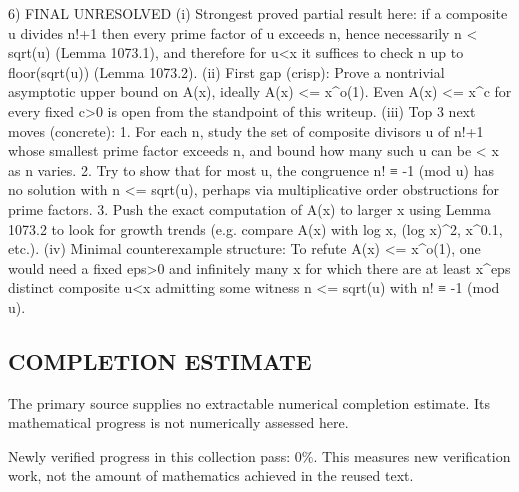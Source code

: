 6) FINAL
UNRESOLVED
(i) Strongest proved partial result here: if a composite u divides n!+1 then every prime factor of u exceeds n, hence necessarily n < sqrt(u) (Lemma 1073.1), and therefore for u<x it suffices to check n up to floor(sqrt(u)) (Lemma 1073.2).
(ii) First gap (crisp): Prove a nontrivial asymptotic upper bound on A(x), ideally A(x) <= x^{o(1)}. Even A(x) <= x^c for every fixed c>0 is open from the standpoint of this writeup.
(iii) Top 3 next moves (concrete):
  1. For each n, study the set of composite divisors u of n!+1 whose smallest prime factor exceeds n, and bound how many such u can be < x as n varies.
  2. Try to show that for most u, the congruence n! ≡ -1 (mod u) has no solution with n <= sqrt(u), perhaps via multiplicative order obstructions for prime factors.
  3. Push the exact computation of A(x) to larger x using Lemma 1073.2 to look for growth trends (e.g. compare A(x) with log x, (log x)^2, x^0.1, etc.).
(iv) Minimal counterexample structure: To refute A(x) <= x^{o(1)}, one would need a fixed eps>0 and infinitely many x for which there are at least x^eps distinct composite u<x admitting some witness n <= sqrt(u) with n! ≡ -1 (mod u).




\subsection*{COMPLETION ESTIMATE}
The primary source supplies no extractable numerical completion estimate. Its mathematical progress is not numerically assessed here.

Newly verified progress in this collection pass: $0\%$. This measures new verification work, not the amount of mathematics achieved in the reused text.
